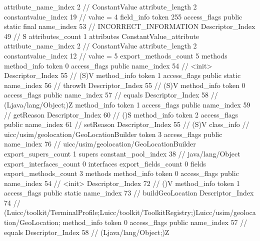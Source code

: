 {{{{{{{					attribute_name_index	2		// ConstantValue
					attribute_length	2
					constantvalue_index	19		// value = 4
				}
				}
			}
			field_info {
				token	255
				access_flags	public static final
				name_index	53		// INCORRECT_INFORMATION
				Descriptor_Index	49		// S
				attributes_count	1
				attributes {
				ConstantValue_attribute {
					attribute_name_index	2		// ConstantValue
					attribute_length	2
					constantvalue_index	12		// value = 5
				}
				}
			}
			}
			export_methods_count	5
			methods {
				method_info {
					token	0
					access_flags	public
					name_index	54		// <init>
					Descriptor_Index	55		// (S)V
				}
				method_info {
					token	1
					access_flags	public static
					name_index	56		// throwIt
					Descriptor_Index	55		// (S)V
				}
				method_info {
					token	0
					access_flags	public
					name_index	57		// equals
					Descriptor_Index	58		// (Ljava/lang/Object;)Z
				}
				method_info {
					token	1
					access_flags	public
					name_index	59		// getReason
					Descriptor_Index	60		// ()S
				}
				method_info {
					token	2
					access_flags	public
					name_index	61		// setReason
					Descriptor_Index	55		// (S)V
				}
			}
		}
		class_info {		// uicc/usim/geolocation/GeoLocationBuilder
			token	3
			access_flags	public
			name_index	76		// uicc/usim/geolocation/GeoLocationBuilder
			export_supers_count	1
			supers {
				constant_pool_index	38		// java/lang/Object
			}
			export_interfaces_count	0
			interfaces {
			}
			export_fields_count	0
			fields {
			}
			export_methods_count	3
			methods {
				method_info {
					token	0
					access_flags	public
					name_index	54		// <init>
					Descriptor_Index	72		// ()V
				}
				method_info {
					token	1
					access_flags	public static
					name_index	73		// buildGeoLocation
					Descriptor_Index	74		// (Luicc/toolkit/TerminalProfile;Luicc/toolkit/ToolkitRegistry;)Luicc/usim/geolocation/GeoLocation;
				}
				method_info {
					token	0
					access_flags	public
					name_index	57		// equals
					Descriptor_Index	58		// (Ljava/lang/Object;)Z
				}
			}
		}
	}
}
